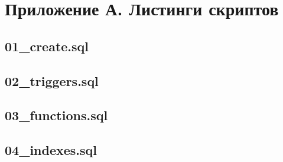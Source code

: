 \documentclass[12pt,a4paper]{article}
\begin{document}
\newpage
\section*{Приложение А. Листинги скриптов}
\subsection*{01\_\allowbreak{}create.sql}

\subsection*{02\_\allowbreak{}triggers.sql}

\subsection*{03\_\allowbreak{}functions.sql}

\subsection*{04\_\allowbreak{}indexes.sql}

\end{document}
